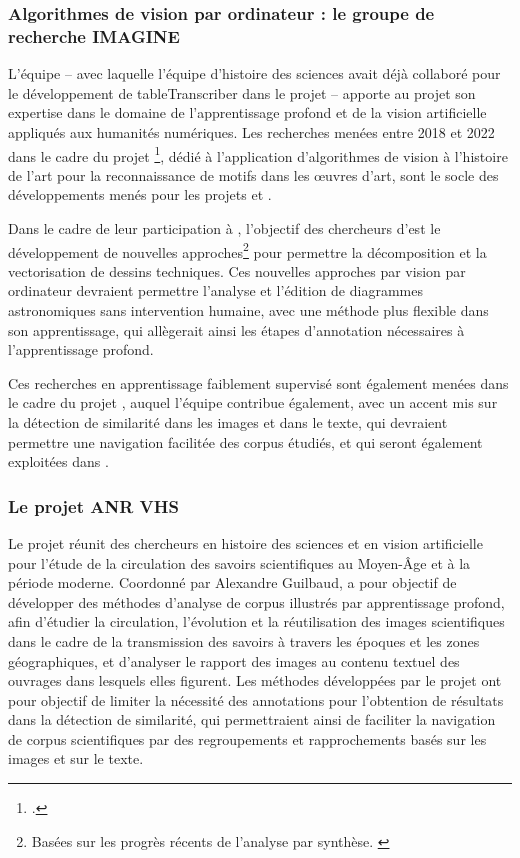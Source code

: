         \subsubsection{Algorithmes de vision par ordinateur : le groupe de recherche IMAGINE}
L'équipe \imagine -- avec laquelle l'équipe d'histoire des sciences avait déjà collaboré pour le développement de tableTranscriber dans le projet \dishas -- apporte au projet \eida son expertise dans le domaine de l'apprentissage profond et de la vision artificielle appliqués aux humanités numériques. Les recherches menées entre 2018 et 2022 dans le cadre du projet \enherit\footcite{EnhancingHeritageImage}, dédié à l'application d'algorithmes de vision à l'histoire de l'art pour la reconnaissance de motifs dans les œuvres d'art, sont le socle des développements menés pour les projets \eida et \vhs. 

Dans le cadre de leur participation à \eida, l'objectif des chercheurs d'\imagine est le développement de nouvelles approches\footnote{Basées sur les progrès récents de l'analyse par synthèse. \cite{monnierUnsupervisedLayeredImage2021}} pour permettre la décomposition et la vectorisation de dessins techniques. Ces nouvelles approches par vision par ordinateur devraient permettre l'analyse et l'édition de diagrammes astronomiques sans intervention humaine, avec une méthode plus flexible dans son apprentissage, qui allègerait ainsi les étapes d'annotation nécessaires à l'apprentissage profond.

Ces recherches en apprentissage faiblement supervisé sont également menées dans le cadre du projet \vhs, auquel l'équipe \imagine contribue également, avec un accent mis sur la détection de similarité dans les images et dans le texte, qui devraient permettre une navigation facilitée des corpus étudiés, et qui seront également exploitées dans \eida.


        \subsubsection{Le projet ANR VHS}
Le projet \vhs réunit des chercheurs en histoire des sciences et en vision artificielle pour l'étude de la circulation des savoirs scientifiques au Moyen-Âge et à la période moderne. Coordonné par Alexandre Guilbaud, \vhs a pour objectif de développer des méthodes d'analyse de corpus illustrés par apprentissage profond, afin d'étudier la circulation, l'évolution et la réutilisation des images scientifiques dans le cadre de la transmission des savoirs à travers les époques et les zones géographiques, et d'analyser le rapport des images au contenu textuel des ouvrages dans lesquels elles figurent. Les méthodes développées par le projet ont pour objectif de limiter la nécessité des annotations pour l'obtention de résultats dans la détection de similarité, qui permettraient ainsi de faciliter la navigation de corpus scientifiques par des regroupements et rapprochements basés sur les images et sur le texte.

